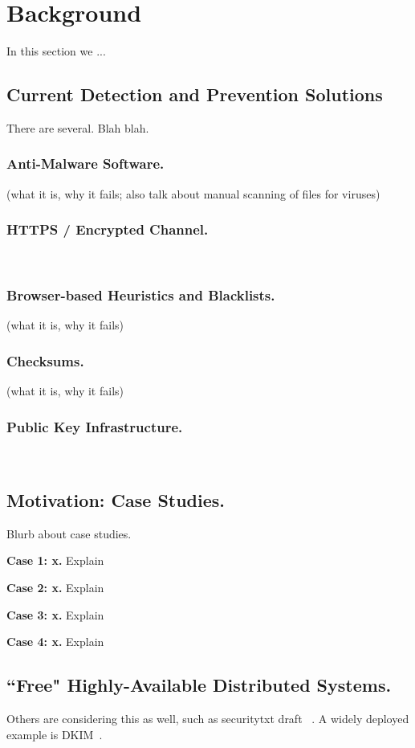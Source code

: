 \section{Background} \label{sec:background}

In this section we ...


\subsection{Current Detection and Prevention Solutions}

There are several. Blah blah.

\subsubsection{Anti-Malware Software.}    (what it is, why it fails; also talk
about manual scanning of files for viruses)

\subsubsection{HTTPS / Encrypted Channel.}   ~\cite{HTTP, HTTPS, TLS1, TLS2, DTLS}

\subsubsection{Browser-based Heuristics and Blacklists.}    (what it is, why it
fails)

\subsubsection{Checksums.}    (what it is, why it fails)

\subsubsection{Public Key Infrastructure.}   ~\cite{DANE1, DANE2, DANE3, OpenPGP1}

\subsection{Motivation: Case Studies.}

Blurb about case studies.

\noindent\textbf{Case 1: x.}    Explain

\noindent\textbf{Case 2: x.}    Explain

\noindent\textbf{Case 3: x.}    Explain

\noindent\textbf{Case 4: x.}    Explain

\subsection{``Free" Highly-Available Distributed Systems.}

Others are considering this as well, such as securitytxt draft
~\cite{draft-sectxt}. A widely deployed example is DKIM~\cite{DKIM}.
